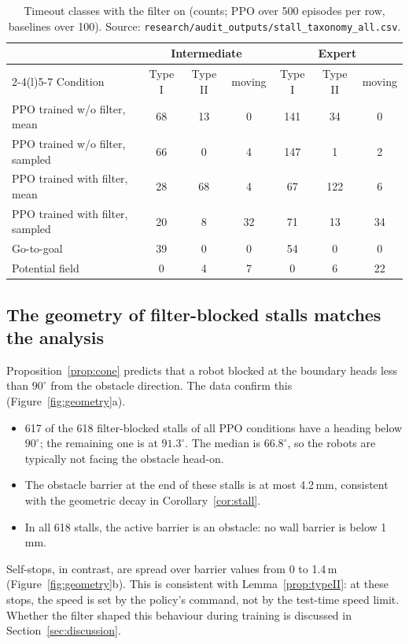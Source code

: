 \documentclass[11pt]{article}
\theoremstyle{definition}
\theoremstyle{remark}
\begin{document}
\begin{table}[t]
\centering\small
\caption{Timeout classes with the filter on (counts; PPO over 500 episodes per row, baselines over 100). Source: \texttt{research/audit\_outputs/stall\_taxonomy\_all.csv}.}
\label{tab:taxonomy}
\begin{tabular}{@{}lcccccc@{}}
\toprule
 & \multicolumn{3}{c}{Intermediate} & \multicolumn{3}{c}{Expert} \\
\cmidrule(lr){2-4}\cmidrule(l){5-7}
Condition & Type I & Type II & moving & Type I & Type II & moving \\
\midrule
PPO trained w/o filter, mean & 68 & 13 & 0 & 141 & 34 & 0 \\
PPO trained w/o filter, sampled & 66 & 0 & 4 & 147 & 1 & 2 \\
PPO trained with filter, mean & 28 & 68 & 4 & 67 & 122 & 6 \\
PPO trained with filter, sampled & 20 & 8 & 32 & 71 & 13 & 34 \\
Go-to-goal & 39 & 0 & 0 & 54 & 0 & 0 \\
Potential field & 0 & 4 & 7 & 0 & 6 & 22 \\
\bottomrule
\end{tabular}
\end{table}

\subsection{The geometry of filter-blocked stalls matches the analysis}
Proposition~\ref{prop:cone} predicts that a robot blocked at the boundary heads less than $90^\circ$ from the obstacle direction. The data confirm this (Figure~\ref{fig:geometry}a).
\begin{itemize}
  \item 617 of the 618 filter-blocked stalls of all PPO conditions have a heading below $90^\circ$; the remaining one is at $91.3^\circ$. The median is $66.8^\circ$, so the robots are typically not facing the obstacle head-on.
  \item The obstacle barrier at the end of these stalls is at most 4.2\,mm, consistent with the geometric decay in Corollary~\ref{cor:stall}.
  \item In all 618 stalls, the active barrier is an obstacle: no wall barrier is below 1\,mm.
\end{itemize}
Self-stops, in contrast, are spread over barrier values from 0 to 1.4\,m (Figure~\ref{fig:geometry}b). This is consistent with Lemma~\ref{prop:typeII}: at these stops, the speed is set by the policy's command, not by the test-time speed limit. Whether the filter shaped this behaviour during training is discussed in Section~\ref{sec:discussion}.
\end{document}
